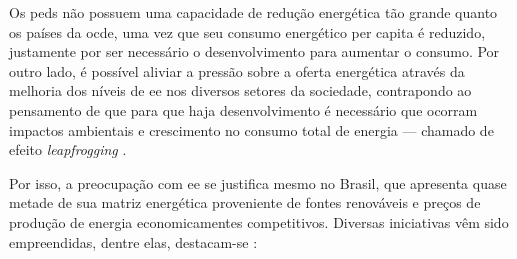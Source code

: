 Os \glspl{ped} não possuem uma capacidade de redução energética tão grande
quanto os países da \gls{ocde}, uma vez que seu consumo energético per capita é
reduzido, justamente por ser necessário o desenvolvimento para aumentar o
consumo. Por outro lado, é possível aliviar a pressão sobre a
oferta energética através da melhoria dos níveis de \gls{ee} nos
diversos setores da sociedade, contrapondo ao pensamento de que para que
haja desenvolvimento é necessário que ocorram impactos ambientais e crescimento no
consumo total de energia --- chamado de efeito \emph{leapfrogging}
\cite{goldemberg}. 

Por isso, a preocupação com \gls{ee} se justifica mesmo no Brasil, 
que apresenta quase metade de sua matriz energética proveniente de fontes 
renováveis e preços de produção de energia economicamentes competitivos.
Diversas iniciativas vêm sido empreendidas, dentre elas, destacam-se
\cite{pnef,pne30_eff_energ,epe_demanda_2012,epe_slides_eficiencia}:

